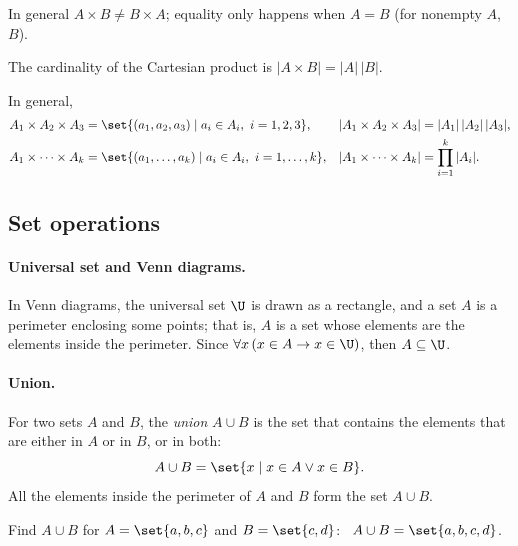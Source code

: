 In general $A \times B \neq B \times A$; equality only happens when $A = B$ (for nonempty $A$, $B$).

The cardinality of the Cartesian product is $|A \times B| = |A|\,|B|$.

In general,
\begin{align*}
A_1 \times A_2 \times A_3 &= \set{(a_1,a_2,a_3) \mid a_i \in A_i,\ i = 1,2,3}, & |A_1 \times A_2 \times A_3| &= |A_1|\,|A_2|\,|A_3|,\\
A_1 \times \cdots \times A_k &= \set{(a_1,\dots,a_k) \mid a_i \in A_i,\ i = 1,\dots,k}, & |A_1 \times \cdots \times A_k| &= \prod_{i=1}^{k} |A_i|.
\end{align*}

\subsection{Set operations}

\paragraph{Universal set and Venn diagrams.}
In Venn diagrams, the universal set $\U$ is drawn as a rectangle, and a set $A$ is a perimeter enclosing some points; that is, $A$ is a set whose elements are the elements inside the perimeter. Since $\forall x\,(x \in A \to x \in \U)$, then $A \subseteq \U$.

\begin{center}
\end{center}

\paragraph{Union.}
For two sets $A$ and $B$, the \emph{union} $A \cup B$ is the set that contains the elements that are either in $A$ or in $B$, or in both:
\[
A \cup B = \set{x \mid x \in A \vee x \in B}.
\]
All the elements inside the perimeter of $A$ and $B$ form the set $A \cup B$.

\begin{example}
Find $A \cup B$ for $A = \set{a,b,c}$ and $B = \set{c,d}$: \ $A \cup B = \set{a,b,c,d}$.
\end{example}

